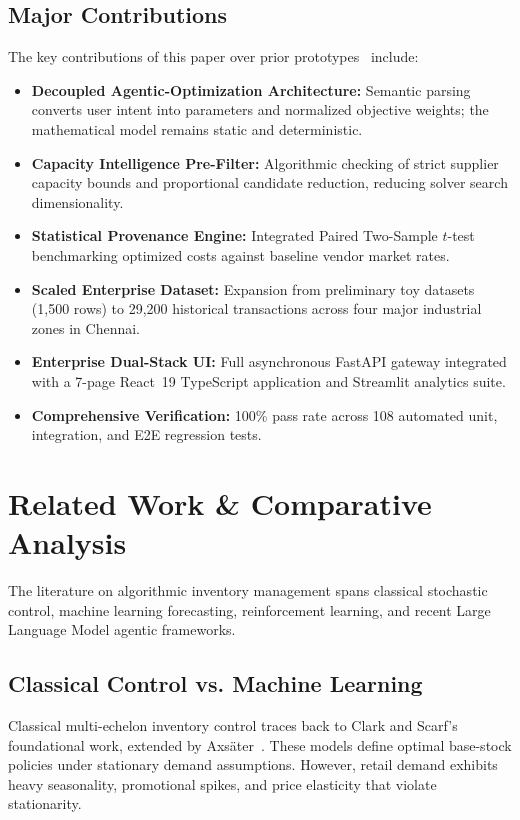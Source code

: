 \documentclass[conference]{IEEEtran}
\begin{document}
\subsection{Major Contributions}
The key contributions of this paper over prior prototypes~\cite{invagent2024} include:
\begin{itemize}
    \item \textbf{Decoupled Agentic-Optimization Architecture:} Semantic parsing converts user intent into parameters and normalized objective weights; the mathematical model remains static and deterministic.
    \item \textbf{Capacity Intelligence Pre-Filter:} Algorithmic checking of strict supplier capacity bounds and proportional candidate reduction, reducing solver search dimensionality.
    \item \textbf{Statistical Provenance Engine:} Integrated Paired Two-Sample $t$-test benchmarking optimized costs against baseline vendor market rates.
    \item \textbf{Scaled Enterprise Dataset:} Expansion from preliminary toy datasets (1,500 rows) to 29,200 historical transactions across four major industrial zones in Chennai.
    \item \textbf{Enterprise Dual-Stack UI:} Full asynchronous FastAPI gateway integrated with a 7-page React~19 TypeScript application and Streamlit analytics suite.
    \item \textbf{Comprehensive Verification:} 100\% pass rate across 108 automated unit, integration, and E2E regression tests.
\end{itemize}

\section{Related Work \& Comparative Analysis}
The literature on algorithmic inventory management spans classical stochastic control, machine learning forecasting, reinforcement learning, and recent Large Language Model agentic frameworks.

\subsection{Classical Control vs. Machine Learning}
Classical multi-echelon inventory control traces back to Clark and Scarf's foundational work, extended by Axs\"ater~\cite{axsater2015}. These models define optimal base-stock policies under stationary demand assumptions. However, retail demand exhibits heavy seasonality, promotional spikes, and price elasticity that violate stationarity.
\end{document}
